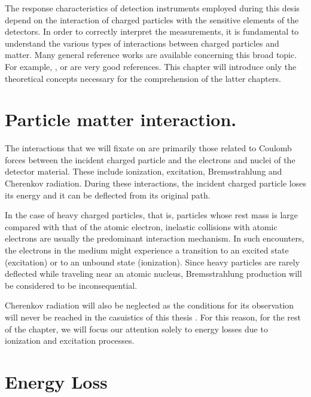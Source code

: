 \pagestyle{fancy}

\graphicspath{ {Figures/Chapter2_BeamMatterInteraction/} }

The response characteristics of detection instruments employed during this desis depend on the interaction of charged particles with the sensitive elements of the detectors. In order to correctly interpret the measurements, it is fundamental to understand the various types of interactions between charged particles and matter. Many general reference works are available concerning this broad topic. For example, \parencite*[]{ref:Knoll}, \parencite*[]{ref:Evans} or \parencite*[]{ref:avernier} are very good references. This chapter will introduce only the theoretical concepts necessary for the comprehension of the latter chapters. 

\section{Particle matter interaction.}

The interactions that we will fixate on are primarily those related to Coulomb forces between the incident charged particle and the electrons and nuclei of the detector material. These include ionization, excitation, Bremsstrahlung and Cherenkov radiation. During these interactions, the incident charged particle loses its energy and it can be deflected from its original path. 

In the case of heavy charged particles, that is, particles whose rest mass is large compared with that of the atomic electron, inelastic collisions with atomic electrons are usually the predominant interaction mechanism. In such encounters, the electrons in the medium might experience a transition to an excited state (excitation) or to an unbound state (ionization). Since heavy particles are rarely deflected while traveling near an atomic nucleus, Bremsstrahlung production will be considered to be inconsequential. 

Cherenkov radiation will also be neglected as the conditions for its observation will never be reached in the casuistics of this thesis \parencite*[]{ref:Cherenkov}. For this reason, for the rest of the chapter, we will focus our attention solely to energy losses due to ionization and excitation processes. 

\section{Energy Loss}

